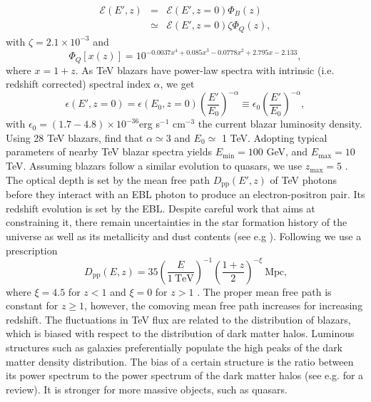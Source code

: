 \documentclass[twocolumns]{emulateapj}
\begin{document}
\begin{eqnarray}
\label{eq:mean_heat}
\mathcal{E}(E',z)&=&\mathcal{E}(E',z=0)\Phi_{B}(z)\\ \nonumber
&\simeq& \mathcal{E}(E',z=0)\zeta\Phi_{Q}(z),
\end{eqnarray}
with $\zeta=2.1\times 10^{-3}$ and
\begin{equation}
\label{eq:phi_quasar}
\Phi_{Q}[x(z)]=10^{-0.0037x^4+0.085x^3-0.0778x^2+2.795x-2.133},
\end{equation}
where $x=1+z$.
As TeV blazars have power-law spectra with intrinsic (i.e. redshift corrected) spectral index $\alpha$, we get
\begin{equation}
\label{eq:blaz_lum}
\epsilon(E',z=0)=\epsilon(E_0,z=0)\left(\frac{E'}{E_0}\right)^{-\alpha}\equiv \epsilon_0\left(\frac{E'}{E_0}\right)^{-\alpha},
\end{equation}
with $\epsilon_0=(1.7-4.8)\times 10^{-36}$erg s$^{-1}$ cm$^{-3}$ the current blazar luminosity density. Using 28 TeV blazars, \citet{2012ApJ...752...23C} find that $\alpha\simeq 3$ and $E_0\simeq $ 1 TeV. Adopting typical parameters of nearby TeV blazar spectra yields $E_{\mathrm{min}}=100$ GeV, and $E_{\mathrm{max}}=10$ TeV. Assuming blazars follow a similar evolution to quasars, we use $z_\mathrm{max}=5$ \citep{2007ApJ...654..731H}.
The optical depth is set by the mean free path $D_\mathrm{pp}(E',z)$ of TeV photons before they interact with an EBL photon to produce an electron-positron pair. Its redshift evolution is set by the EBL. Despite careful work that aims at constraining it, there remain uncertainties in the star formation history of the universe as well as its metallicity and dust contents (see e.g \citet{2008A&A...487..837F,2006ApJ...648..774S}). Following \citet{2012ApJ...752...23C} we use a prescription
\begin{equation}
\label{eq:mean_free_path}
D_{\mathrm{pp}}(E,z)=35\left(\frac{E}{1~\textrm{TeV}}\right)^{-1} \left(\frac{1+z}{2}\right)^{-\xi}~\textrm{Mpc,}
\end{equation}
where $\xi=4.5$ for $z<1$ and $\xi=0$ for $z>1$ \citep{2004A&A...413..807K,2009PhRvD..80l3012N}. The proper mean free path is constant for $z\geq 1$, however, the comoving mean free path increases for increasing redshift.
The fluctuations in TeV flux are related to the distribution of blazars, which is biased with respect to the distribution of dark matter halos. Luminous structures such as galaxies preferentially populate the high peaks of the dark matter density distribution. The bias of a certain structure is the ratio between its power spectrum to the power spectrum of the dark matter halos (see e.g. \citet{2002PhR...372....1C} for a review). It is stronger for more massive objects, such as quasars.
\end{document}

